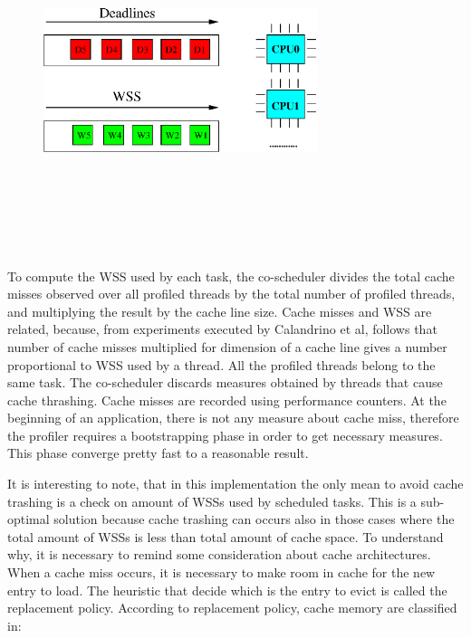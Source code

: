 \begin{description}
\begin{figure}[htbp]
\centering
\includegraphics[width=8cm,height=10cm, keepaspectratio]{images/edf_wss.eps}
\caption{}
\label{fig:edf_wss}
\end{figure}

To compute the WSS used by each task, the co-scheduler divides the total cache misses observed over all profiled threads by the total number of profiled 
threads, and multiplying the result by the cache line size. Cache misses and WSS are related, because, from experiments executed by Calandrino et al, 
follows that number of cache misses multiplied for dimension of a cache line gives a number proportional to WSS used by a thread. All the profiled threads 
belong to the same task. The co-scheduler discards measures obtained by threads that cause cache thrashing. Cache misses are recorded using performance 
counters. At the beginning of an application, there is not any measure about cache miss, therefore the profiler requires a bootstrapping phase in order to 
get necessary measures. This phase converge pretty fast to a reasonable result.

It is interesting to note, that in this implementation the only mean to avoid cache trashing is a check on amount of WSSs used by scheduled tasks.
This is a sub-optimal solution because cache trashing can occurs also in those cases where the total amount of WSSs is less than total amount of cache
space. To understand why, it is necessary to remind some consideration about cache architectures. When a cache miss occurs, it is necessary to make room 
in cache for the new entry to load. The heuristic that decide which is the entry to evict is called the replacement policy. According to replacement policy,
cache memory are classified in:


\end{description}
